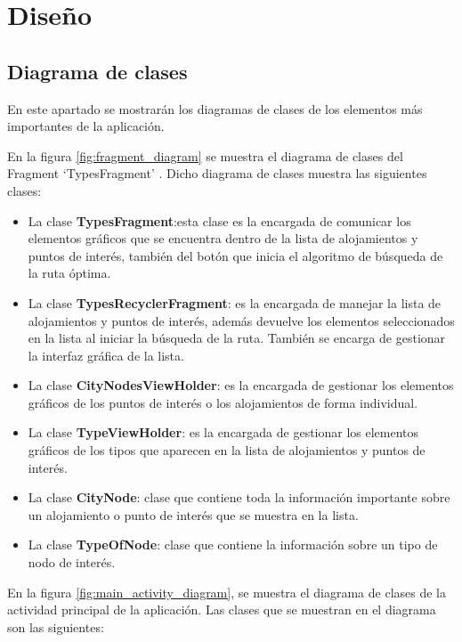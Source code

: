 \section{Diseño}
\subsection[Diagrama de clases]{Diagrama de clases}
En este apartado se mostrarán los diagramas de clases de los elementos más importantes de la aplicación.\newline

En la figura \ref{fig:fragment_diagram} se muestra el diagrama de clases del Fragment \enquote*{TypesFragment} . Dicho diagrama de clases muestra las siguientes clases:
\begin{itemize}
	\item La clase \textbf{TypesFragment}:esta clase es la encargada de comunicar los elementos gráficos que se encuentra dentro de la lista de alojamientos y puntos de interés, también del botón que inicia el algoritmo de búsqueda de la ruta óptima.
	\item La clase \textbf{TypesRecyclerFragment}: es la encargada de manejar la lista de alojamientos y puntos de interés, además devuelve los elementos seleccionados en la lista al iniciar la búsqueda de la ruta. También se encarga de gestionar la interfaz gráfica de la lista.
	\item La clase \textbf{CityNodesViewHolder}: es la encargada de gestionar los elementos gráficos de los puntos de interés o los alojamientos de forma individual.
	\item La clase \textbf{TypeViewHolder}: es la encargada de gestionar los elementos gráficos de los tipos que aparecen en la lista de alojamientos y puntos de interés.
	\item La clase \textbf{CityNode}: clase que contiene toda la información importante sobre un alojamiento o punto de interés que se muestra en la lista.
	\item La clase \textbf{TypeOfNode}: clase que contiene la información sobre un tipo de nodo de interés.
\end{itemize}
\vspace{0.06in}
En la figura  \ref{fig:main_activity_diagram}, se muestra el diagrama de clases de la actividad principal de la aplicación. Las clases que se muestran en el diagrama son las siguientes:

